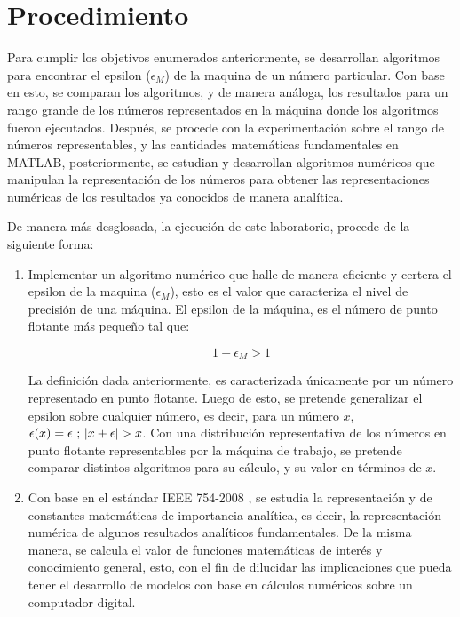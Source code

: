 \documentclass[11pt, spanish]{article}
\begin{document}
\section{Procedimiento}

Para cumplir los objetivos enumerados anteriormente, se desarrollan algoritmos para encontrar el epsilon ($\epsilon_M$) de la maquina de un número particular. Con base en esto, se comparan los algoritmos, y de manera análoga, los resultados para un rango grande de los números representados en la máquina donde los algoritmos fueron ejecutados. Después, se procede con la experimentación sobre el rango de números representables, y las cantidades matemáticas fundamentales en \textsc{MATLAB}, posteriormente, se estudian y desarrollan algoritmos numéricos que manipulan la representación de los números para obtener las representaciones numéricas de los resultados ya conocidos de manera analítica.

De manera más desglosada, la ejecución de este laboratorio, procede de la siguiente forma:

\begin{enumerate}

\item Implementar un algoritmo numérico que halle de manera eficiente y certera el epsilon de la maquina ($\epsilon_M$), esto es el valor que caracteriza el nivel de precisión de una máquina. El epsilon de la máquina, es el número de punto flotante más pequeño tal que: \cite{forsythe1977computer}

$$1 + \epsilon_M > 1$$

La definición dada anteriormente, es caracterizada únicamente por un número representado en punto flotante. Luego de esto, se pretende generalizar el epsilon sobre cualquier número, es decir, para un número $x$, $\epsilon(x) = \epsilon \ ;\ \abs{x + \epsilon} > x$. Con una distribución representativa de los números en punto flotante representables por la máquina de trabajo, se pretende comparar distintos algoritmos para su cálculo, y su valor en términos de $x$.

\item Con base en el estándar IEEE 754-2008 \cite{ieeestd}, se estudia la representación y de constantes matemáticas de importancia analítica, es decir, la representación numérica de algunos resultados analíticos fundamentales. De la misma manera, se calcula el valor de funciones matemáticas de interés y conocimiento general, esto, con el fin de dilucidar las implicaciones que pueda tener el desarrollo de modelos con base en cálculos numéricos sobre un computador digital.

\end{enumerate}
\end{document}
